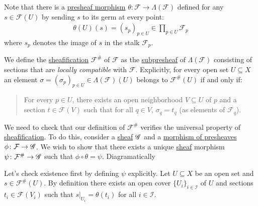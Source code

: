 \documentclass[../../main]{subfiles}
\begin{document}
\begin{construction}
  Note that there is a \hyperref[def:presheaf]{presheaf morphism} \(\theta\colon \mathcal{F} \to \Lambda(\mathcal{F})\) defined for any \(s \in \mathcal{F}(U)\) by sending \(s\) to its germ at every point:
  \begin{align*}
    \theta(U)(s) = (s_{p})_{p \in U} \in \prod_{p \in U} \mathcal{F}_{p}
  \end{align*}
  where \(s_{p}\) denotes the image of \(s\) in the stalk \(\mathcal{F}_{p}\).

  We define the \hyperref[def:sheafification]{sheafification} \(\mathcal{F}^{\#}\) of \(\mathcal{F}\) as the \hyperref[def:types-of-morphisms-pre-sheaves]{subpresheaf} of \(\Lambda(\mathcal{F})\) consisting of sections that are \textit{locally compatible} with \(\mathcal{F}\).
  Explicitly, for every open set \(U \subseteq X\) an element \(\sigma = (\sigma_{p})_{p \in U} \in \Lambda(\mathcal{F})(U)\) belongs to \(\mathcal{F}^{\#}(U)\) if and only if:
  \begin{quote}
    For every \(p \in U\), there exists an open neighborhood \(V \subseteq U\) of \(p\) and a section \(t \in \mathcal{F}(V)\) such that for all \(q \in V\), \(\sigma_{q} = t_{q}\) (as elements of \(\mathcal{F}_{q}\)).
  \end{quote}

  We need to check that our definition of \(\mathcal{F}^{\#}\) verifies the universal property of \hyperref[def:sheafification]{sheafification}.
  To do this, consider a \hyperref[def:sheaf]{sheaf} \(\mathscr{G}\) and a \hyperref[def:presheaf]{morphism of presheaves} \(\phi\colon \mathcal{F} \to \mathscr{G}\).
  We wish to show that there exists a unique \hyperref[def:sheaf]{sheaf} morphism \(\psi\colon \mathcal{F}^{\#} \to \mathscr{G}\) such that \(\phi \circ \theta = \psi\).
  Diagramatically
  \begin{center}
  \end{center}

  Let's check existence first by defining \(\psi\) explicitly.
  Let \(U \subseteq X\) be an open set and \(s \in \mathcal{F}^{\#}(U)\).
  By definition there exists an open cover \(\{U_{i}\}_{i \in \mathcal{I}}\) of \(U\) and sections \(t_{i} \in \mathcal{F}(V_{i})\) such that \(s|_{U_{i}} = \theta(t_{i})\) for all \(i \in \mathcal{I}\).


\end{construction}
\end{document}
